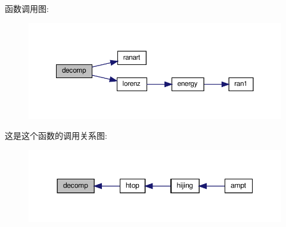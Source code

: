 函数调用图\+:
\nopagebreak
\begin{figure}[H]
\begin{center}
\leavevmode
\includegraphics[width=350pt]{decomp_8f90_a21efea88b92ed6ac3d10356bbcae0c11_cgraph}
\end{center}
\end{figure}
这是这个函数的调用关系图\+:
\nopagebreak
\begin{figure}[H]
\begin{center}
\leavevmode
\includegraphics[width=350pt]{decomp_8f90_a21efea88b92ed6ac3d10356bbcae0c11_icgraph}
\end{center}
\end{figure}
